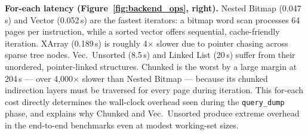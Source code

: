 \textbf{For-each latency (Figure~\ref{fig:backend_ops}, right).}\enspace
Nested Bitmap (0.047\,s) and Vector (0.052\,s) are the fastest iterators:
a bitmap word scan processes 64 pages per instruction, while a sorted vector
offers sequential, cache-friendly iteration.
XArray (0.189\,s) is roughly 4$\times$ slower due to pointer chasing across
sparse tree nodes.
Vec.\ Unsorted (8.5\,s) and Linked List (20\,s) suffer from their
unordered, pointer-linked structures.
Chunked is the worst by a large margin at 204\,s --- over 4{,}000$\times$
slower than Nested Bitmap --- because its chunked indirection layers must
be traversed for every page during iteration.
This for-each cost directly determines the wall-clock overhead seen during
the \texttt{query\_dump} phase, and explains why Chunked and Vec.\ Unsorted
produce extreme overhead in the end-to-end benchmarks even at modest
working-set sizes.

